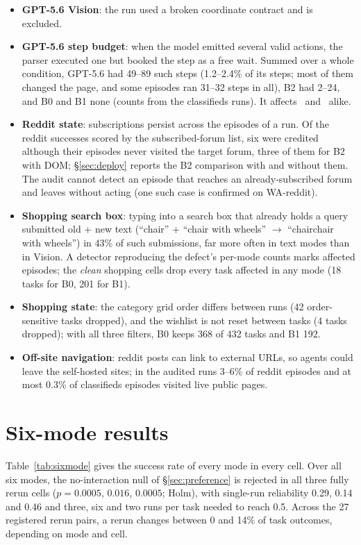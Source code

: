 \begin{itemize}\setlength{\itemsep}{1pt}
  \item \textbf{GPT-5.6 Vision}: the run used a broken coordinate contract and is excluded.
  \item \textbf{GPT-5.6 step budget}: when the model emitted several valid actions, the parser executed one but booked the step as a free wait. Summed over a whole condition, GPT-5.6 had 49--89 such steps (1.2--2.4\% of its steps; most of them changed the page, and some episodes ran 31--32 steps in all), B2 had 2--24, and B0 and B1 none (counts from the classifieds runs). It affects \SoM\ and \PSoM\ alike.
  \item \textbf{Reddit state}: subscriptions persist across the episodes of a run. Of the reddit successes scored by the subscribed-forum list, six were credited although their episodes never visited the target forum, three of them for B2 with DOM; \S\ref{sec:deploy} reports the B2 comparison with and without them. The audit cannot detect an episode that reaches an already-subscribed forum and leaves without acting (one such case is confirmed on WA-reddit).
  \item \textbf{Shopping search box}: typing into a search box that already holds a query submitted old + new text (``chair'' + ``chair with wheels'' $\to$ ``chairchair with wheels'') in 43\% of such submissions, far more often in text modes than in Vision. A detector reproducing the defect's per-mode counts marks affected episodes; the \emph{clean} shopping cells drop every task affected in any mode (18 tasks for B0, 201 for B1).
  \item \textbf{Shopping state}: the category grid order differs between runs (42 order-sensitive tasks dropped), and the wishlist is not reset between tasks (4 tasks dropped); with all three filters, B0 keeps 368 of 432 tasks and B1 192.
  \item \textbf{Off-site navigation}: reddit posts can link to external URLs, so agents could leave the self-hosted sites; in the audited runs 3--6\% of reddit episodes and at most 0.3\% of classifieds episodes visited live public pages. %
\end{itemize}

\section{Six-mode results}\label{app:sixarm}

Table~\ref{tab:sixmode} gives the success rate of every mode in every cell. %
Over all six modes, the no-interaction null of \S\ref{sec:preference} is rejected in all three fully rerun cells ($p=0.0005$, $0.016$, $0.0005$; Holm), with single-run reliability 0.29, 0.14 and 0.46 and three, six and two runs per task needed to reach 0.5. %
Across the 27 registered rerun pairs, a rerun changes between 0 and 14\% of task outcomes, depending on mode and cell. %


